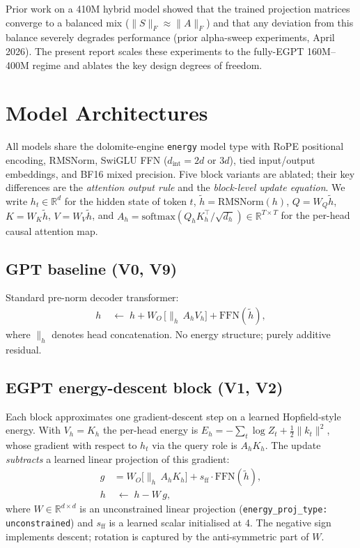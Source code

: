 \documentclass[11pt,a4paper]{article}
\begin{document}
Prior work on a 410M hybrid model showed that the trained projection matrices converge to a
balanced mix ($\|S\|_F \approx \|A\|_F$) and that any deviation from this balance
severely degrades performance (prior alpha-sweep experiments, April 2026).
The present report scales these experiments to the fully-EGPT 160M--400M regime and ablates
the key design degrees of freedom.

\section{Model Architectures}

All models share the dolomite-engine \texttt{energy} model type with RoPE positional
encoding, RMSNorm, SwiGLU FFN ($d_{\mathrm{int}} = 2d$ or $3d$), tied input/output
embeddings, and BF16 mixed precision.
Five block variants are ablated; their key differences are the \emph{attention output rule}
and the \emph{block-level update equation}.
We write $h_t \in \mathbb{R}^d$ for the hidden state of token $t$,
$\tilde{h} = \mathrm{RMSNorm}(h)$,
$Q = W_Q \tilde{h}$, $K = W_K \tilde{h}$, $V = W_V \tilde{h}$,
and $A_h = \mathrm{softmax}\!\left(Q_h K_h^\top / \sqrt{d_h}\right) \in \mathbb{R}^{T \times T}$
for the per-head causal attention map.

\subsection{GPT baseline (V0, V9)}

Standard pre-norm decoder transformer:
\begin{align}
  h &\;\leftarrow\; h + W_O\,\bigl[\|_h\, A_h V_h\bigr] + \mathrm{FFN}(\tilde{h}),
\end{align}
where $\|_h$ denotes head concatenation.  No energy structure; purely additive residual.

\subsection{EGPT energy-descent block (V1, V2)}

Each block approximates one gradient-descent step on a learned Hopfield-style energy.
With $V_h = K_h$ the per-head energy is
$E_h = -\sum_{t} \log Z_t + \tfrac{1}{2}\|k_t\|^2$,
whose gradient with respect to $h_t$ via the query role is $A_h K_h$.
The update \emph{subtracts} a learned linear projection of this gradient:
\begin{align}
  g &= W_O\bigl[\|_h\, A_h K_h\bigr] + s_{\mathrm{ff}}\cdot\mathrm{FFN}(\tilde{h}),
  \label{eq:egpt_grad}\\
  h &\;\leftarrow\; h - W\, g,
  \label{eq:egpt_update}
\end{align}
where $W \in \mathbb{R}^{d \times d}$ is an unconstrained linear projection
(\texttt{energy\_proj\_type: unconstrained}) and $s_{\mathrm{ff}}$ is a learned scalar
initialised at 4.  The negative sign implements descent; rotation is captured by the
anti-symmetric part of $W$.
\end{document}
